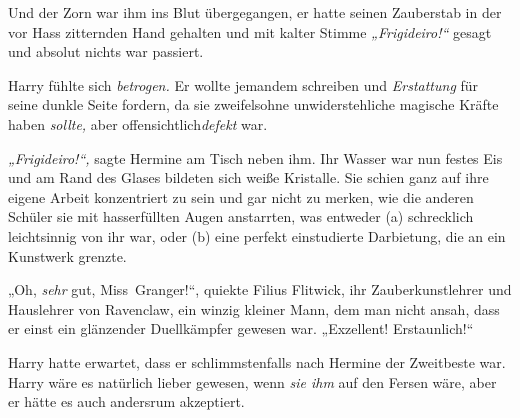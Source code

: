 Und der Zorn war ihm ins Blut übergegangen, er hatte seinen Zauberstab in der vor Hass zitternden Hand gehalten und mit kalter Stimme \emph{„Frigideiro!“} gesagt und absolut nichts war passiert. 

Harry fühlte sich \emph{betrogen.} Er wollte jemandem schreiben und \emph{Erstattung} für seine dunkle Seite fordern, da sie zweifelsohne unwiderstehliche magische Kräfte haben \emph{sollte,} aber offensichtlich\emph{defekt} war.

\emph{„Frigideiro!“,} sagte Hermine am Tisch neben ihm. Ihr Wasser war nun festes Eis und am Rand des Glases bildeten sich weiße Kristalle. Sie schien ganz auf ihre eigene Arbeit konzentriert zu sein und gar nicht zu merken, wie die anderen Schüler sie mit hasserfüllten Augen anstarrten, was entweder (a) schrecklich leichtsinnig von ihr war, oder (b) eine perfekt einstudierte Darbietung, die an ein Kunstwerk grenzte. 

„Oh, \emph{sehr} gut, Miss~Granger!“, quiekte Filius Flitwick, ihr Zauberkunstlehrer und Hauslehrer von Ravenclaw, ein winzig kleiner Mann, dem man nicht ansah, dass er einst ein glänzender Duellkämpfer gewesen war. „Exzellent! Erstaunlich!“ 

Harry hatte erwartet, dass er schlimmstenfalls nach Hermine der Zweitbeste war. Harry wäre es natürlich lieber gewesen, wenn \emph{sie ihm} auf den Fersen wäre, aber er hätte es auch andersrum akzeptiert. 

